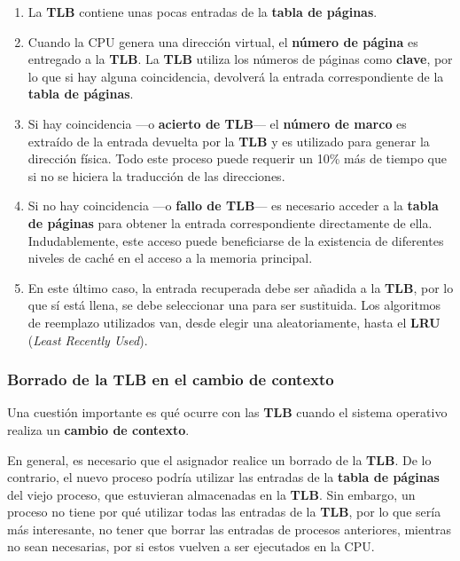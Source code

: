 \begin{enumerate}
\def\labelenumi{\arabic{enumi}.}
\item
  La \textbf{TLB} contiene unas pocas entradas de la \textbf{tabla de
  páginas}.
\item
  Cuando la CPU genera una dirección virtual, el \textbf{número de
  página} es entregado a la \textbf{TLB}. La \textbf{TLB} utiliza los
  números de páginas como \textbf{clave}, por lo que si hay alguna
  coincidencia, devolverá la entrada correspondiente de la \textbf{tabla
  de páginas}.
\item
  Si hay coincidencia ---o \textbf{acierto de TLB}--- el \textbf{número
  de marco} es extraído de la entrada devuelta por la \textbf{TLB} y es
  utilizado para generar la dirección física. Todo este proceso puede
  requerir un 10\% más de tiempo que si no se hiciera la traducción de
  las direcciones.
\item
  Si no hay coincidencia ---o \textbf{fallo de TLB}--- es necesario
  acceder a la \textbf{tabla de páginas} para obtener la entrada
  correspondiente directamente de ella. Indudablemente, este acceso
  puede beneficiarse de la existencia de diferentes niveles de caché en
  el acceso a la memoria principal.
\item
  En este último caso, la entrada recuperada debe ser añadida a la
  \textbf{TLB}, por lo que sí está llena, se debe seleccionar una para
  ser sustituida. Los algoritmos de reemplazo utilizados van, desde
  elegir una aleatoriamente, hasta el \textbf{{}LRU} (\emph{Least
  Recently Used}).
\end{enumerate}

\subsubsection{Borrado de la TLB en el cambio de
contexto}\label{_borrado_de_la_tlb_en_el_cambio_de_contexto}

Una cuestión importante es qué ocurre con las \textbf{TLB} cuando el
sistema operativo realiza un \textbf{cambio de contexto}.

En general, es necesario que el asignador realice un borrado de la
\textbf{TLB}. De lo contrario, el nuevo proceso podría utilizar las
entradas de la \textbf{tabla de páginas} del viejo proceso, que
estuvieran almacenadas en la \textbf{TLB}. Sin embargo, un proceso no
tiene por qué utilizar todas las entradas de la \textbf{TLB}, por lo que
sería más interesante, no tener que borrar las entradas de procesos
anteriores, mientras no sean necesarias, por si estos vuelven a ser
ejecutados en la CPU.

